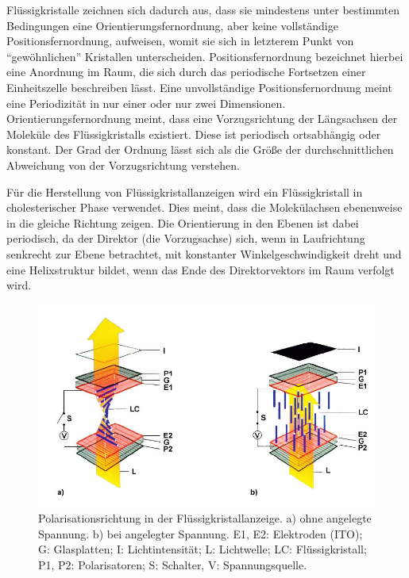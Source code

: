 \documentclass[
	a4paper,
	12pt,
	pagesize,
	ngerman
]{scrartcl}
\begin{document}
	Flüssigkristalle zeichnen sich dadurch aus, dass sie mindestens unter bestimmten Bedingungen eine Orientierungsfernordnung, aber keine vollständige Positionsfernordnung, aufweisen, womit sie sich in letzterem Punkt von \enquote{gewöhnlichen} Kristallen unterscheiden.
	Positionsfernordnung bezeichnet hierbei eine Anordnung im Raum, die sich durch das periodische Fortsetzen einer Einheitszelle beschreiben lässt.
	Eine unvollständige Positionsfernordnung meint eine Periodizität in nur einer oder nur zwei Dimensionen.
	Orientierungsfernordnung meint, dass eine Vorzugsrichtung der Längsachsen der Moleküle des Flüssigkristalls existiert.
	Diese ist periodisch ortsabhängig oder konstant.
	Der Grad der Ordnung lässt sich als die Größe der durchschnittlichen Abweichung von der Vorzugsrichtung verstehen.

	Für die Herstellung von Flüssigkristallanzeigen wird ein Flüssigkristall in cholesterischer Phase verwendet. %
	Dies meint, dass die Molekülachsen ebenenweise in die gleiche Richtung zeigen.
	Die Orientierung in den Ebenen ist dabei periodisch, da der Direktor (die Vorzugsachse) sich, wenn in Laufrichtung senkrecht zur Ebene betrachtet, mit konstanter Winkelgeschwindigkeit dreht und  eine Helixstruktur bildet, wenn das Ende des Direktorvektors im Raum verfolgt wird.

	\begin{figure}[H]
			\includegraphics[width=1\linewidth]{img/displayHelix}
			\caption{
			Polarisationsrichtung in der Flüssigkristallanzeige. a) ohne angelegte Spannung. b) bei angelegter Spannung. E1, E2: Elektroden (ITO); G: Glasplatten; I: Lichtintensität; L: Lichtwelle; LC: Flüssigkristall;
P1, P2: Polarisatoren; S: Schalter, V: Spannungsquelle. \cite{displayHelix}
			}
			\label{fig_displayHelixBild}
	\end{figure}
\end{document}
